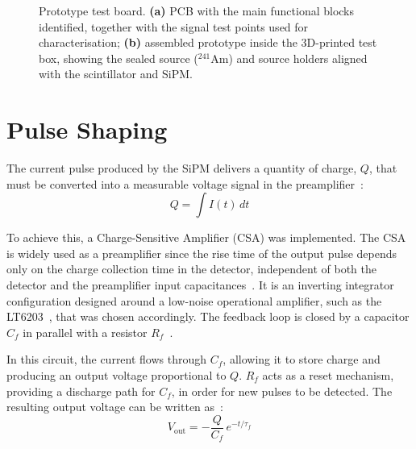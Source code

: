 \begin{figure}[H]
  \centering
  \begin{minipage}[c]{0.52\linewidth}
    \centering
    \subfloat[]{\label{fig:pcb_test}%
      \resizebox{\linewidth}{!}{}}
  \end{minipage}%
  \hfill%
  \begin{minipage}[c]{0.48\linewidth}
    \centering
    \subfloat[]{\label{fig:dori_case}%
      \resizebox{\linewidth}{!}{}}
  \end{minipage}
  \caption[Prototype test board.]{%
    Prototype test board.
    \textbf{(a)} PCB with the main functional blocks identified, together with the signal test points used for characterisation;
    \textbf{(b)} assembled prototype inside the 3D-printed test box, showing the sealed source ($^{241}$Am) and source holders aligned with the scintillator and SiPM.
  }
  \label{fig:pcb}
\end{figure}

\section{Pulse Shaping}
\label{sec:shaping}
The current pulse produced by the SiPM delivers a quantity of charge, $Q$, that must be converted into a measurable voltage signal in the preamplifier~\cite{105}:
\begin{equation}
    Q = \int I(t)\, dt
    \label{eq:charge}
\end{equation}

To achieve this, a Charge-Sensitive Amplifier (CSA) was implemented. The CSA is widely used as a preamplifier since the rise time of the output pulse depends only on the charge collection time in the detector, independent of both the detector and the preamplifier input capacitances~\cite{14}. It is an inverting integrator configuration designed around a low-noise operational amplifier, such as the LT6203~\cite{LT6202_LT6203_LT6204}, that was chosen accordingly. The feedback loop is closed by a capacitor $C_f$ in parallel with a resistor $R_f$~\cite{106,14}.

In this circuit, the current flows through $C_f$, allowing it to store charge and producing an output voltage proportional to $Q$. $R_f$ acts as a reset mechanism, providing a discharge path for $C_f$, in order for new pulses to be detected. The resulting output voltage can be written as~\cite{104,105}:
\begin{equation}
    V_{\text{out}} = -\frac{Q}{C_f}\, e^{-t/\tau_f}
    \label{eq:vout}
\end{equation}

